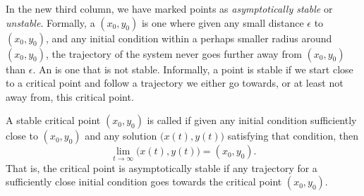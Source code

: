 In the new third column,
we have marked points as \emph{asymptotically stable} or \emph{unstable}.  Formally, a
\emph{} $(x_0,y_0)$ is one where given any small distance $\epsilon$ to
$(x_0,y_0)$, and any initial condition within a perhaps smaller radius
around $(x_0,y_0)$, the trajectory
of the system never goes further away from $(x_0,y_0)$ than $\epsilon$.
An \emph{} is one that is not stable.
Informally, a point is stable if we start close to a critical point and
follow a trajectory we either go towards, or at least not away
from,
this critical point.

A stable critical point $(x_0,y_0)$ is called \emph{} if
given any initial condition sufficiently close to $(x_0,y_0)$ and any
solution $\bigl( x(t), y(t) \bigr)$ satisfying that condition, then
\begin{equation*}
\lim_{t \to \infty} \bigl( x(t), y(t) \bigr) = (x_0,y_0) .
\end{equation*}
That is, the critical point is asymptotically stable
if any trajectory for a sufficiently close initial condition
goes towards the critical point $(x_0,y_0)$.

